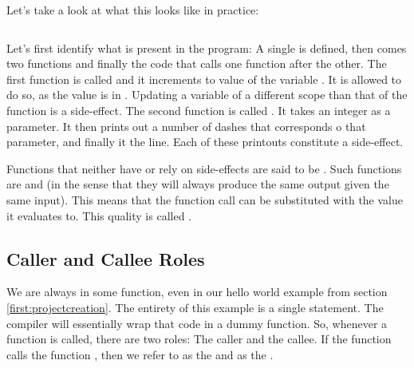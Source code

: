 Let's take a look at what this looks like in practice:

\inputminted[]{csharp}{../src/csharp/functions/sideeffects/Program.cs}

Let's first identify what is present in the program: A single  is defined, then comes two functions and finally the  code that calls one function after the other. The first function is called  and it increments to value of the variable . It is allowed to do so, as the value is in . Updating a variable of a different scope than that of the function is a side-effect. The second function is called . It takes an integer as a parameter. It then prints out a number of dashes that corresponds o that parameter, and finally it  the line. Each of these printouts constitute a side-effect.

Functions that neither have or rely on side-effects are said to be . Such functions are  and  (in the sense that they will always produce the same output given the same input). This means that the function call can be substituted with the value it evaluates to. This quality is called .

\subsection{Caller and Callee Roles}

We are always in some function, even in our hello world example from section \ref{first:projectcreation}. The entirety of this example is a single statement. The compiler will essentially wrap that code in a dummy function. So, whenever a function is called, there are two roles: The caller and the callee. If the function  calls the function , then we refer to  as the  and  as the .

